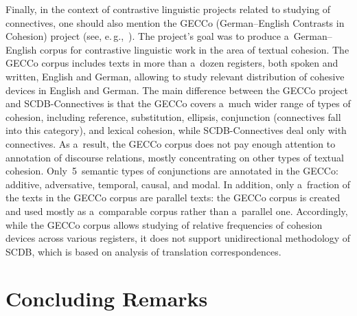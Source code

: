 \begin{multicols}{2}
  Finally, in the context of contrastive linguistic projects related to studying of 
connectives, one should also mention the GECCo (German--English Contrasts in Cohesion)
project (see, e.\,g.,~\cite{18-kr}). 
The project's goal was to produce a~German--English corpus for contrastive linguistic 
work in the area of textual cohesion. The GECCo corpus includes texts in more than 
a~dozen registers, both spoken and written, English and German, allowing to study 
relevant distribution of cohesive devices in English and German. The main difference 
between the GECCo project and SCDB-Connectives is that the GECCo covers 
a~much wider range of types of cohesion, including reference, substitution, ellipsis, 
conjunction (connectives fall into this category), and lexical cohesion, while  
SCDB-Connectives deal only with connectives. As a~result, the GECCo corpus does 
not pay enough attention to annotation of discourse relations, mostly concentrating on 
other types of textual cohesion. Only~5~semantic types of conjunctions are annotated 
in the GECCo: additive, adversative, temporal, causal, and modal. In addition, only 
a~fraction of the texts in the GECCo corpus are parallel texts: the GECCo corpus is 
created and used mostly as a~comparable corpus rather than a~parallel one. 
Accordingly, while the GECCo corpus allows studying of relative frequencies of 
cohesion devices across various registers, it does not support unidirectional 
methodology of SCDB, which is based on analysis of translation correspondences.

\vspace*{-6pt}
  
  \section{Concluding Remarks}
  
  \vspace*{-2pt}
  

\end{multicols}
